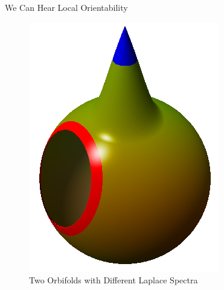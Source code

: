 \documentclass[12pt]{beamer}
\begin{document}
\begin{frame}{We Can Hear Local Orientability}
\begin{figure}
\begin{columns}[c]
\begin{column}[c]{0.28\textwidth}
                \includegraphics[width=\textwidth]{images/teardrop_edge.png}
            \end{column}
        \end{columns}
        \caption{Two Orbifolds with Different Laplace Spectra}
    \end{figure}
\end{frame}
\end{document}
